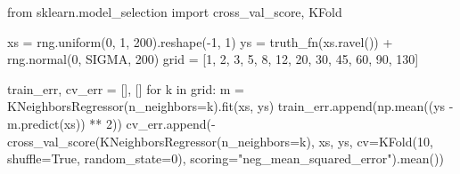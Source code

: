 \documentclass[
  letterpaper,
  10pt,
  twoside,
  openright,
  numbers=noenddot,
  chapterprefix=true]{scrbook}
\newenvironment{Shaded}{}{}
\newcommand{\ControlFlowTok}[1]{\textcolor[rgb]{0.84,0.23,0.29}{#1}}
\newcommand{\DecValTok}[1]{\textcolor[rgb]{0.00,0.36,0.77}{#1}}
\newcommand{\ImportTok}[1]{\textcolor[rgb]{0.01,0.18,0.38}{#1}}
\newcommand{\KeywordTok}[1]{\textcolor[rgb]{0.84,0.23,0.29}{#1}}
\newcommand{\NormalTok}[1]{\textcolor[rgb]{0.14,0.16,0.18}{#1}}
\newcommand{\OperatorTok}[1]{\textcolor[rgb]{0.14,0.16,0.18}{#1}}
\newcommand{\StringTok}[1]{\textcolor[rgb]{0.01,0.18,0.38}{#1}}
\newcommand{\VariableTok}[1]{\textcolor[rgb]{0.89,0.38,0.04}{#1}}
\begin{document}
\begin{Shaded}
\begin{Highlighting}[]
\ImportTok{from}\NormalTok{ sklearn.model\_selection }\ImportTok{import}\NormalTok{ cross\_val\_score, KFold}

\NormalTok{xs }\OperatorTok{=}\NormalTok{ rng.uniform(}\DecValTok{0}\NormalTok{, }\DecValTok{1}\NormalTok{, }\DecValTok{200}\NormalTok{).reshape(}\OperatorTok{{-}}\DecValTok{1}\NormalTok{, }\DecValTok{1}\NormalTok{)}
\NormalTok{ys }\OperatorTok{=}\NormalTok{ truth\_fn(xs.ravel()) }\OperatorTok{+}\NormalTok{ rng.normal(}\DecValTok{0}\NormalTok{, SIGMA, }\DecValTok{200}\NormalTok{)}
\NormalTok{grid }\OperatorTok{=}\NormalTok{ [}\DecValTok{1}\NormalTok{, }\DecValTok{2}\NormalTok{, }\DecValTok{3}\NormalTok{, }\DecValTok{5}\NormalTok{, }\DecValTok{8}\NormalTok{, }\DecValTok{12}\NormalTok{, }\DecValTok{20}\NormalTok{, }\DecValTok{30}\NormalTok{, }\DecValTok{45}\NormalTok{, }\DecValTok{60}\NormalTok{, }\DecValTok{90}\NormalTok{, }\DecValTok{130}\NormalTok{]}

\NormalTok{train\_err, cv\_err }\OperatorTok{=}\NormalTok{ [], []}
\ControlFlowTok{for}\NormalTok{ k }\KeywordTok{in}\NormalTok{ grid:}
\NormalTok{    m }\OperatorTok{=}\NormalTok{ KNeighborsRegressor(n\_neighbors}\OperatorTok{=}\NormalTok{k).fit(xs, ys)}
\NormalTok{    train\_err.append(np.mean((ys }\OperatorTok{{-}}\NormalTok{ m.predict(xs)) }\OperatorTok{**} \DecValTok{2}\NormalTok{))}
\NormalTok{    cv\_err.append(}\OperatorTok{{-}}\NormalTok{cross\_val\_score(KNeighborsRegressor(n\_neighbors}\OperatorTok{=}\NormalTok{k), xs, ys,}
\NormalTok{                                   cv}\OperatorTok{=}\NormalTok{KFold(}\DecValTok{10}\NormalTok{, shuffle}\OperatorTok{=}\VariableTok{True}\NormalTok{, random\_state}\OperatorTok{=}\DecValTok{0}\NormalTok{),}
\NormalTok{                                   scoring}\OperatorTok{=}\StringTok{"neg\_mean\_squared\_error"}\NormalTok{).mean())}


\end{Highlighting}
\end{Shaded}
\end{document}
